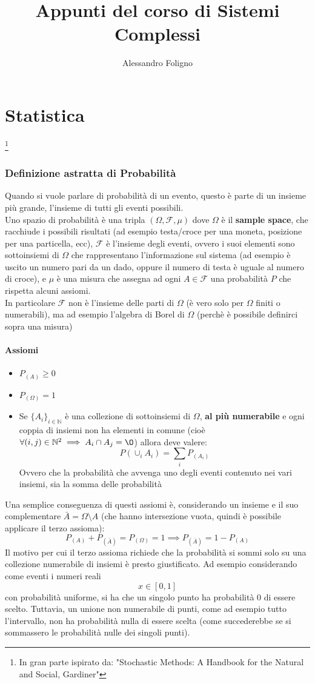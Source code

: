 \documentclass[a4paper,12pt]{article}
\title{Appunti del corso di Sistemi Complessi}
\author{ Alessandro Foligno}
\renewcommand{\arg}[1]{_{(#1)}}
\theoremstyle{plain}
\theoremstyle{definition}
\newcommand{\Op}[1]{\mathcal{#1}}
\theoremstyle{remark}
\begin{document}
	\tableofcontents
	\part{Statistica}\footnote{In gran parte ispirato da: "Stochastic Methods: A Handbook for the Natural and Social, Gardiner"}


	\section{Definizione astratta di Probabilità}
	Quando si vuole parlare di probabilità di un evento, questo è parte di un insieme più grande, l'insieme di tutti gli eventi possibili.\\
	
	Uno spazio di probabilità è una tripla $(\Omega,\Op{F},\mu)$ dove $\Omega$ è il \textbf{sample space}, che racchiude i possibili risultati (ad esempio testa/croce per una moneta, posizione per una particella, ecc), $\Op{F}$ è l'insieme degli eventi, ovvero i suoi elementi sono sottoinsiemi di $\Omega$ che rappresentano l'informazione sul sistema (ad esempio è uscito un numero pari da un dado, oppure il numero di testa è uguale al numero di croce), e $\mu$ è una misura che assegna ad ogni $A\in \Op{F}$ una probabilità $P$ che rispetta alcuni assiomi.\\In particolare $\Op{F}$ non è l'insieme delle parti di $\Omega$ (è vero solo per $\Omega$ finiti o numerabili), ma ad esempio l'algebra di Borel di $\Omega$ (perchè è possibile definirci sopra una misura)
	\subsection{Assiomi}

	\begin{itemize}
		\item $P\arg{A}\ge0$
		\item $P\arg{\Omega}=1$
		\item Se $\{A_i\}_{i\in \mathbb{N}}$ è una collezione di sottoinsiemi di $\Omega$, \textbf{al più numerabile} e ogni coppia di insiemi non ha elementi in comune (cioè $\forall (i,j)\in \mathbb{N}^2 \implies A_i \cap A_j=\O$) allora deve valere:
		\[P\left({\cup_i A_i}\right)=\sum_i P\arg{A_i}		\]
		Ovvero che la probabilità che avvenga uno degli eventi contenuto nei vari insiemi, sia la somma delle probabilità
	\end{itemize}
	Una semplice conseguenza di questi assiomi è, considerando un insieme e il suo complementare $\bar{A}=\Omega\setminus A$ (che hanno intersezione vuota, quindi è possibile applicare il terzo assioma):
	\[P\arg{A}+	P\arg{\bar{A}}=P\arg{\Omega}=1\implies P\arg{\bar{A}}=1-P\arg{A}	\]
	Il motivo per cui il terzo assioma richiede che la probabilità si sommi solo su una collezione numerabile di insiemi è presto giustificato. Ad esempio considerando come eventi i numeri reali\[x\in[0,1]\] con probabilità uniforme,
	si ha che un singolo punto ha probabilità $0$ di essere scelto. Tuttavia, un unione non numerabile di punti, come ad esempio tutto l'intervallo, non ha probabilità nulla di essere scelta (come succederebbe se si sommassero le probabilità nulle dei singoli punti).
	
\end{document}
